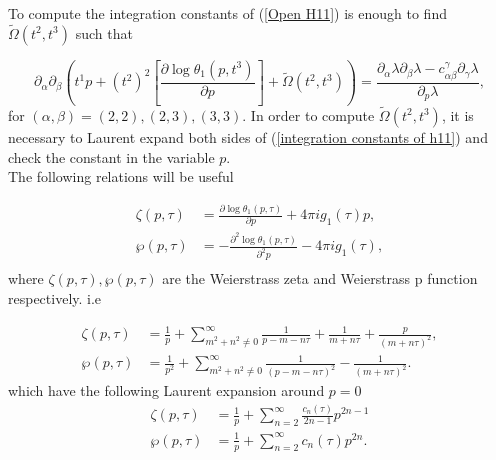 \documentclass{article}
\theoremstyle{definition}
\begin{document}
To compute the integration constants of (\ref{Open H11}) is enough to find  $\tilde\Omega(t^2,t^3) $ such that 

 \begin{equation}\label{integration constants of h11}
\partial_{\alpha}\partial_{\beta}\left(t^1p+(t^2)^2\left[\frac{\partial \log\theta_1(p,t^3)}{\partial p}\right]+\tilde\Omega(t^2,t^3)   \right)= \frac{ \partial_{\alpha}\lambda \partial_{\beta}\lambda -c_{\alpha\beta}^{\gamma}\partial_{\gamma}\lambda}{ \partial_{p}\lambda},
\end{equation}
for $(\alpha,\beta)=(2,2),(2,3),(3,3)$. In order to compute $\tilde\Omega(t^2,t^3) $, it is necessary to Laurent expand both sides of (\ref{integration constants of h11}) and check the constant in the variable $p$.\\


The following relations will be useful

\begin{equation}\label{relation theta and Wp and Wz}
\begin{split}
\zeta(p,\tau)&=\frac{\partial \log \theta_1(p,\tau)}{\partial p}+4\pi ig_1(\tau)p,\\
\wp(p,\tau)&=-\frac{\partial^2 \log \theta_1(p,\tau)}{\partial^2 p}-4\pi ig_1(\tau),\\
\end{split}
\end{equation}
where $\zeta(p,\tau) ,\wp(p,\tau)$ are the Weierstrass zeta and Weierstrass p function respectively. i.e


\begin{equation*}
\begin{split}
\zeta(p,\tau)&=\frac{1}{p}+\sum_{m^2+n^2\neq 0}^{\infty}\frac{1}{p-m-n\tau}+\frac{1}{m+n\tau}+\frac{p}{(m+n\tau)^2},\\
\wp(p,\tau)&=\frac{1}{p^2}+\sum_{m^2+n^2\neq 0}^{\infty}\frac{1}{(p-m-n\tau)^2}-\frac{1}{(m+n\tau)^2}.
\end{split}
\end{equation*}
which have the following Laurent expansion around $p=0$
\begin{equation}\label{Laurent exp of Wp and Wz}
\begin{split}
\zeta(p,\tau)&=\frac{1}{p}+\sum_{n=2}^{\infty} \frac{c_n(\tau)}{2n-1}p^{2n-1}\\
\wp(p,\tau)&=\frac{1}{p}+\sum_{n=2}^{\infty} c_n(\tau)p^{2n}.
\end{split}
\end{equation}
\end{document}
